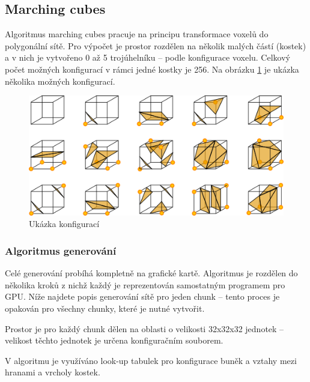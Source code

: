 \documentclass[12pt,a4paper,titlepage,final]{report}
\begin{document}
\subsection{Marching cubes}
Algoritmus marching cubes pracuje na principu transformace voxelů do polygonální sítě. Pro výpočet je prostor rozdělen na několik malých částí (kostek) a v nich je vytvořeno 0 až 5 trojúhelníku -- podle konfigurace voxelu. Celkový počet možných konfigurací v rámci jedné kostky je 256. Na obrázku \ref{fig:mc} je ukázka několika možných konfigurací.


\begin{figure}[H]
    \centering
    \includegraphics[scale=1]{images/MarchingCubes.png}
    \caption{Ukázka konfigurací}
    \label{fig:mc}
\end{figure}

\subsubsection{Algoritmus generování}
Celé generování probíhá kompletně na grafické kartě. Algoritmus je rozdělen do několika kroků z nichž každý je reprezentován samostatným programem pro GPU. Níže najdete popis generování sítě pro jeden chunk -- tento proces je opakován pro všechny chunky, které je nutné vytvořit.

Prostor je pro každý chunk dělen na oblasti o velikosti 32x32x32 jednotek -- velikost těchto jednotek je určena konfiguračním souborem.

V algoritmu je využíváno look-up tabulek pro konfigurace buněk a vztahy mezi hranami a vrcholy kostek.
\end{document}
